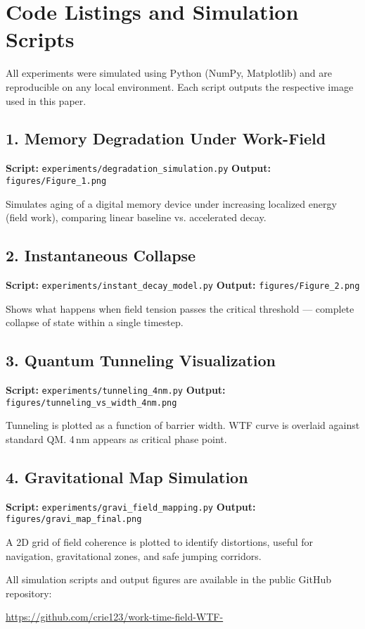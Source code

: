 \section{Code Listings and Simulation Scripts}

All experiments were simulated using Python (NumPy, Matplotlib) and are reproducible on any local environment. Each script outputs the respective image used in this paper.

\subsection{1. Memory Degradation Under Work-Field}

\textbf{Script:} \texttt{experiments/degradation\_simulation.py}  
\textbf{Output:} \texttt{figures/Figure\_1.png}

Simulates aging of a digital memory device under increasing localized energy (field work), comparing linear baseline vs. accelerated decay.

\subsection{2. Instantaneous Collapse}

\textbf{Script:} \texttt{experiments/instant\_decay\_model.py}  
\textbf{Output:} \texttt{figures/Figure\_2.png}

Shows what happens when field tension passes the critical threshold — complete collapse of state within a single timestep.

\subsection{3. Quantum Tunneling Visualization}

\textbf{Script:} \texttt{experiments/tunneling\_4nm.py}  
\textbf{Output:} \texttt{figures/tunneling\_vs\_width\_4nm.png}

Tunneling is plotted as a function of barrier width. WTF curve is overlaid against standard QM. 4\,nm appears as critical phase point.

\subsection{4. Gravitational Map Simulation}

\textbf{Script:} \texttt{experiments/gravi\_field\_mapping.py}  
\textbf{Output:} \texttt{figures/gravi\_map\_final.png}

A 2D grid of field coherence is plotted to identify distortions, useful for navigation, gravitational zones, and safe jumping corridors.

\vspace{1em}

All simulation scripts and output figures are available in the public GitHub repository:
\begin{center}
\url{https://github.com/crie123/work-time-field-WTF-}
\end{center}
